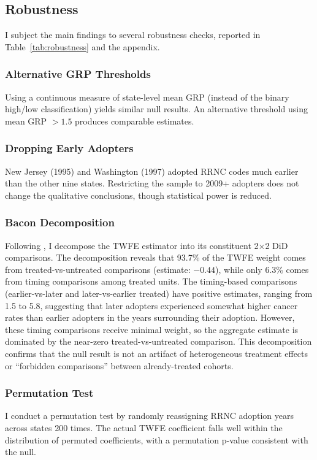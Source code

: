 \documentclass[12pt]{article}
\begin{document}
\subsection{Robustness}

I subject the main findings to several robustness checks, reported in Table~\ref{tab:robustness} and the appendix.

\subsubsection*{Alternative GRP Thresholds} Using a continuous measure of state-level mean GRP (instead of the binary high/low classification) yields similar null results. An alternative threshold using mean GRP $> 1.5$ produces comparable estimates.

\subsubsection*{Dropping Early Adopters} New Jersey (1995) and Washington (1997) adopted RRNC codes much earlier than the other nine states. Restricting the sample to 2009+ adopters does not change the qualitative conclusions, though statistical power is reduced.

\subsubsection*{Bacon Decomposition} Following \citet{goodman2021difference}, I decompose the TWFE estimator into its constituent 2$\times$2 DiD comparisons. The decomposition reveals that 93.7\% of the TWFE weight comes from treated-vs-untreated comparisons (estimate: $-0.44$), while only 6.3\% comes from timing comparisons among treated units. The timing-based comparisons (earlier-vs-later and later-vs-earlier treated) have positive estimates, ranging from 1.5 to 5.8, suggesting that later adopters experienced somewhat higher cancer rates than earlier adopters in the years surrounding their adoption. However, these timing comparisons receive minimal weight, so the aggregate estimate is dominated by the near-zero treated-vs-untreated comparison. This decomposition confirms that the null result is not an artifact of heterogeneous treatment effects or ``forbidden comparisons'' between already-treated cohorts.

\subsubsection*{Permutation Test} I conduct a permutation test by randomly reassigning RRNC adoption years across states 200 times. The actual TWFE coefficient falls well within the distribution of permuted coefficients, with a permutation p-value consistent with the null.
\end{document}
